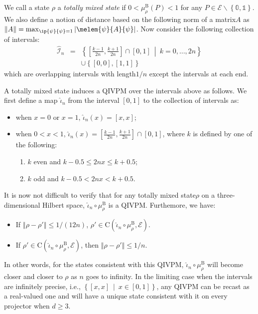 \documentclass[english,reprint, aps, prl,superscriptaddress, showpacs,
showkeys, longbibliography, amsmath, amssymb]{revtex4-1}
\theoremstyle{plain}
\theoremstyle{definition}
\newcommand{\events}{\ensuremath{\mathcal{E}}}
\newcommand{\set}[2]{\ensuremath{\left\{ {#1}~\middle|~{#2}\right\} }}
\newcommand{\coreBorn}{\ensuremath{\mathrm{C}}}
\newcommand{\nb}{\nolinebreak[1] }
\begin{document}
We call a state $\rho$ a \emph{totally mixed state} if
$0<\mu_{\rho}^{\mathrm{B}}\left(P\right)<1$ for any
$P\in\events\backslash\left\{ \mathbb{0},\mathbb{1}\right\} $. We also
define a notion of distance based on the following norm of a
matrix\nb$A$ as
$\left\Vert A\right\Vert
=\max_{\ip{\psi}{\psi}=1}\left|\melem{\psi}{A}{\psi}\right|$\nb\citep{544199}. Now
consider the following collection of intervals:
\begin{eqnarray}
\widehat{\mathscr{I}}_{n} & = & \set{\left[\frac{k-1}{2n},\frac{k+1}{2n}\right]\cap\left[0,1\right]}{k=0,\ldots,2n}\nonumber \\
 &  & \cup\left\{ \left[0,0\right],\left[1,1\right]\right\} 
\end{eqnarray}
which are overlapping intervals with length\nb$1/n$ except the intervals
at each end. 

A totally mixed state induces a QIVPM over the intervals above as
follows. We first define a map $\widehat{\iota}_{n}$ from the interval
$[0,1]$ to the collection of intervals as:
\begin{itemize}
\item when $x=0$ or $x=1$, $\widehat{\iota}_{n}\left(x\right)=\left[x,x\right]$;
\item when $0<x<1$, $\widehat{\iota}_{n}\left(x\right)=\left[\frac{k-1}{2n},\frac{k+1}{2n}\right]\cap\left[0,1\right]$,
where $k$ is defined by one of the following:
\begin{enumerate}
\item $k$ even and $k-0.5\le2nx\le k+0.5$;
\item $k$ odd and $k-0.5<2nx<k+0.5$.
\end{enumerate}
\end{itemize}

It is now not difficult to verify that for any totally mixed
state\nb$\rho$ on a three-dimensional Hilbert space,
$\widehat{\iota}_{n}\circ\mu_{\rho}^{\mathrm{B}}$ is a
QIVPM. Furthemore, we have:
\begin{itemize}
\item If $\left\Vert \rho-\rho'\right\Vert \le1/\left(12n\right)$,
$\rho'\in\coreBorn\left(\widehat{\iota}_{n}\circ\mu_{\rho}^{\mathrm{B}},\events\right)$.
\item If $\rho'\in\coreBorn\left(\widehat{\iota}_{n}\circ\mu_{\rho}^{\mathrm{B}},\events\right)$,
then $\left\Vert \rho-\rho'\right\Vert \le1/n$.
\end{itemize}
In other words, for the states consistent with this QIVPM,
$\widehat{\iota}_{n}\circ\mu_{\rho}^{\mathrm{B}}$ will become closer and
closer to $\rho$ as $n$ goes to infinity. In the limiting case when
the intervals are infinitely precise, i.e.,
$\set{\left[x,x\right]}{x\in\left[0,1\right]}$, any QIVPM can be
recast as a real-valued one and will have a unique state consistent
with it on every projector when $d\ge3$.
\end{document}
